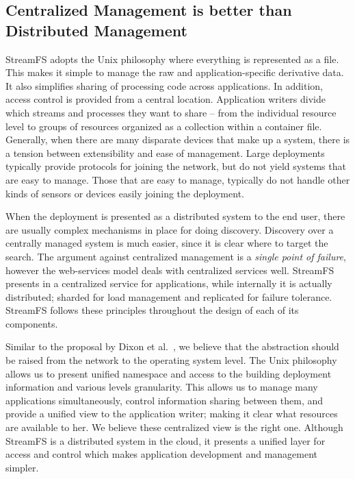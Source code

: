 \subsection{Centralized Management is better than Distributed Management}
StreamFS adopts the Unix philosophy where everything is represented as a file.  This makes it simple to manage the raw
and application-specific derivative data.  It also simplifies sharing of processing code across applications.  In addition, 
access control is provided from a central location.  Application writers divide which streams and processes they 
want to share -- from the individual resource level to groups of resources organized as a collection within a container file.
Generally, when there are many disparate devices that make up a system, there is a tension between extensibility 
and ease of management.  Large deployments typically provide protocols for joining the network, but do not yield systems that are 
easy to manage.  Those that are easy to manage, typically do not handle other kinds of sensors or devices easily joining
the deployment.

When the deployment is presented as a distributed system to the end user, there are usually complex mechanisms in place for doing 
discovery.  Discovery over a centrally managed system is much easier, since it is clear where to target the search.
The argument against centralized management is a \emph{single point of failure}, however the web-services model
deals with centralized services well.  StreamFS presents in a centralized service for applications, while 
internally it is actually distributed; sharded for load management and replicated for failure tolerance.  StreamFS follows
these principles throughout the design of each of its components.

Similar to the proposal by Dixon et al.~\cite{homeos}, we believe that the abstraction should be raised from the network
to the operating system level.  The Unix philosophy allows us to present unified namespace and access to the building deployment
information and various levels granularity.  This allows us to manage many applications simultaneously, control information
sharing between them, and provide a unified view to the application writer; making it clear what resources are available to her.
We believe these centralized view is the right one.  Although StreamFS is a distributed system in the cloud, it presents a unified 
layer for access and control which makes application development and management simpler.


